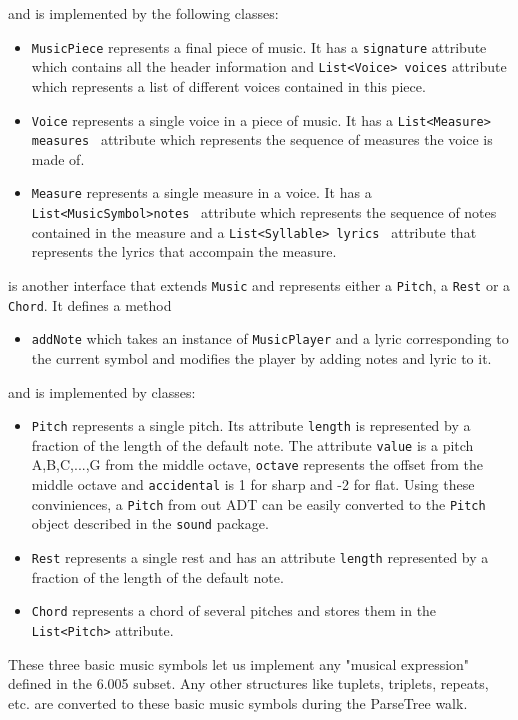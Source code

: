 \documentclass[12pt]{book}
\begin{document}
\noindent and is implemented by the following classes:
\begin{itemize} 
\item { \tt MusicPiece} represents a final piece of music.   It has a {\tt signature} attribute which contains all the header information and {\tt List<Voice> voices} attribute which represents a list of different voices contained in this piece.
\item {\tt Voice}  represents a single voice in a piece of music. It has a {\tt List<Measure> measures } attribute which represents the sequence of measures the voice is made of.
\item {\tt Measure}  represents a single measure in a voice. It has a {\tt List<MusicSymbol>notes } attribute which represents the sequence of notes contained in the measure and a  {\tt List<Syllable> lyrics } attribute that represents the lyrics that accompain the measure.
\end{itemize}

\bigskip

 is another interface that extends {\tt Music} and represents either a {\tt Pitch}, a {\tt Rest} or a {\tt Chord}. It defines a method
\begin{itemize} 
\item { \tt addNote} which takes an instance of  {\tt MusicPlayer} and a lyric corresponding to the current symbol and modifies the player by adding notes and lyric to it. 
\end{itemize}
\noindent and is implemented by classes:
\begin{itemize} 
\item { \tt Pitch} represents a single pitch. Its attribute {\tt length} is represented by a fraction  of the length of the default note. The attribute {\tt value} is a pitch A,B,C,...,G from the middle octave,  {\tt octave} represents the offset from the middle octave and  {\tt accidental} is 1 for sharp and -2 for flat. Using these conviniences,  a {\tt Pitch} from out ADT can be easily converted to the {\tt Pitch} object described in the {\tt sound} package.
\item { \tt Rest} represents a single rest and has an attribute {\tt length}  represented by a fraction of the length of the default note. 
\item {\tt Chord} represents a chord of several pitches and stores them in the {\tt List<Pitch>} attribute.
\end{itemize}

These three basic music symbols let us implement any "musical expression" defined in the 6.005 subset. Any other structures like tuplets, triplets, repeats, etc. are converted to these basic music symbols during the ParseTree walk.  
\end{document}

